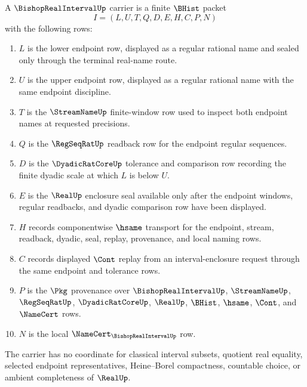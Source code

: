 \begin{definition}
\label{def:bishop-real-interval-carrier}
A $\BishopRealIntervalUp$ carrier is a finite $\BHist$ packet
$$
I=(L,U,T,Q,D,E,H,C,P,N)
$$
with the following rows:
\begin{enumerate}
\item $L$ is the lower endpoint row, displayed as a regular rational name and sealed only through the terminal real-name route.
\item $U$ is the upper endpoint row, displayed as a regular rational name with the same endpoint discipline.
\item $T$ is the $\StreamNameUp$ finite-window row used to inspect both endpoint names at requested precisions.
\item $Q$ is the $\RegSeqRatUp$ readback row for the endpoint regular sequences.
\item $D$ is the $\DyadicRatCoreUp$ tolerance and comparison row recording the finite dyadic scale at which $L$ is below $U$.
\item $E$ is the $\RealUp$ enclosure seal available only after the endpoint windows, regular readbacks, and dyadic comparison row have been displayed.
\item $H$ records componentwise $\hsame$ transport for the endpoint, stream, readback, dyadic, seal, replay, provenance, and local naming rows.
\item $C$ records displayed $\Cont$ replay from an interval-enclosure request through the same endpoint and tolerance rows.
\item $P$ is the $\Pkg$ provenance over $\BishopRealIntervalUp$, $\StreamNameUp$, $\RegSeqRatUp$, $\DyadicRatCoreUp$, $\RealUp$, $\BHist$, $\hsame$, $\Cont$, and $\NameCert$ rows.
\item $N$ is the local $\NameCert_{\BishopRealIntervalUp}$ row.
\end{enumerate}
The carrier has no coordinate for classical interval subsets, quotient real equality, selected endpoint representatives, Heine--Borel compactness, countable choice, or ambient completeness of $\RealUp$.
\end{definition}

